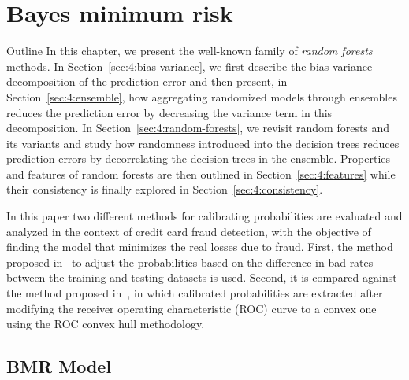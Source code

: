
\chapter{Bayes minimum risk}

\begin{remark}{Outline}
In this chapter, we present the well-known family of \textit{random forests}
methods. In Section~\ref{sec:4:bias-variance}, we first describe the bias-variance
decomposition of the prediction error and then present, in
Section~\ref{sec:4:ensemble}, how aggregating randomized models through
ensembles reduces the prediction error by decreasing the variance term in this
decomposition. In Section~\ref{sec:4:random-forests}, we revisit random forests
and its variants and study how randomness introduced into the decision trees
reduces prediction errors by decorrelating the decision
trees in the ensemble. Properties and features of random forests are then outlined
in Section~\ref{sec:4:features} while their consistency
is finally explored in Section~\ref{sec:4:consistency}.
\end{remark}


  In this paper two different methods for calibrating probabilities are evaluated and analyzed in 
the context
  of credit card fraud detection, with the objective of finding the model that minimizes the real 
losses due to fraud.
  First, the method proposed \mbox{in \citep{Elkan2001}} to adjust the probabilities based on the 
difference in
  bad rates between the training and testing datasets is used.
  Second, it is compared against the method proposed \mbox{in \citep{Hernandez-Orallo2012}},
  in which calibrated probabilities are extracted after modifying the receiver operating 
characteristic (ROC) curve
  to a convex one using the ROC convex hull methodology.
  
\section{BMR Model}

